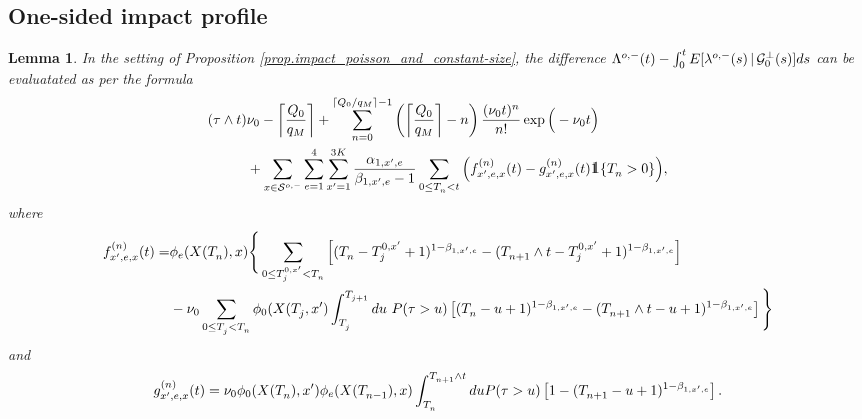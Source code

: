 \documentclass[10pt]{article}
\newtheorem{lemma}[thm]{Lemma}
\begin{document}
\subsection{One-sided impact profile}
\begin{lemma}\label{lemma.implementation_of_one-sided_impact}
 In the setting of Proposition \ref{prop.impact_poisson_and_constant-size}, the difference $\weakDeflCompensator(t) - \intzerot \Expectation[\weakDeflIntensity(s)\,\vert\,\sigmaAlgebraG_{0}\orthogonal(s)]ds$ can be evaluatated as per the formula
 \begin{equation}\label{eq.evaluation_of_one-sided_impact}
 \begin{split}
  (\terminationTime\wedge t) &\baseRate_{0}
  - \left\lceil \frac{\metaorderSize}{q_{M}}\right\rceil
  + \sum_{n=0}^{\lceil\metaorderSize/q_{M}\rceil -1}
  \left( \left\lceil \frac{\metaorderSize}{q_{M}}\right\rceil - n\right)\frac{(\baseRate_{0} t)^n}{n!} \exp \Big( - \baseRate_{0} t \Big)
  \\
  &+
  \sum_{x\in\weakDeflSpace}\sum_{e=1}^{4}\sum_{\xone=1}^{3K}
  \frac{\impCoef_{1,\xone,e}}{\decCoef_{1,\xone,e} -1}
  \sum_{0\leq \arrivalTimes[]_n < t}
  \Big(
  f^{(n)}_{\xone,e,x}(t) - g^{(n)}_{\xone,e,x}(t) \one\lbrace \arrivalTimes[]_n >0\rbrace
  \Big),
  \end{split}
 \end{equation}
where 
\begin{equation*}
\begin{split}
 f^{(n)}_{\xone,e,x} (t)
 =&
 \transProb_{e} (\stateVariable(\arrivalTimes[]_n),x)
 \Bigg\lbrace
 \sum_{0\leq \arrivalTimes[0,\xone]_j < \arrivalTimes[]_n}
 \left[
 (\arrivalTimes[]_n - \arrivalTimes[0,\xone]_j +1)^{1-\decCoef_{1,\xone,e}}
 -
 (\arrivalTimes[]_{n+1}\wedge t - \arrivalTimes[0,\xone]_j +1)^{1-\decCoef_{1,\xone,e}}
 \right]
 \\
 &-
 \baseRate_{0} \sum_{0\leq \arrivalTimes[]_j < \arrivalTimes[]_n}
 \transProb_{0}(\stateVariable(\arrivalTimes[]_j,\xone)
 \int_{\arrivalTimes[]_j}^{\arrivalTimes[]_{j+1}}
 du \, \,  \Prob(\terminationTime>u)
 \left[
 (\arrivalTimes[]_n - u +1)^{1-\decCoef_{1,\xone,e}}
 -
 (\arrivalTimes[]_{n+1}\wedge t - u +1)^{1-\decCoef_{1,\xone,e}}
 \right]
 \Bigg\rbrace
 \end{split}
\end{equation*}
and 
\begin{equation*}
 g^{(n)}_{\xone,e,x} (t) = 
 \baseRate_{0} \transProb_{0} (\stateVariable(\arrivalTimes[]_{n}),\xone)\transProb_{e} (\stateVariable(\arrivalTimes[]_{n-1}),x)
 \int_{\arrivalTimes[]_n}^{\arrivalTimes[]_{n+1}\wedge t}
 du \Prob(\terminationTime>u)
 \left[
 1 -
 (\arrivalTimes[]_{n+1} - u +1)^{1-\decCoef_{1,\xone,e}}
 \right].
\end{equation*}
\end{lemma}
\end{document}
